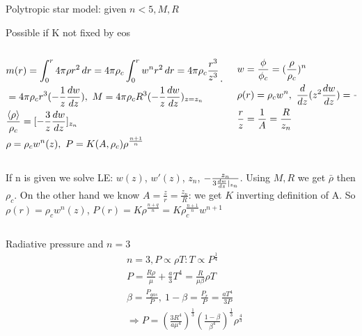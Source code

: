 \begin{frame}{Polytropic star model: given $n<5, M, R$}
\begin{block}{Possible if K not fixed by eos}
    \begin{columns}[T]
        \begin{column}{0.6\textwidth}
    \begin{align*}
&m(r)=\int_0^r4\pi\rho r^2\,dr=4\pi\rho_c\int_0^rw^nr^2\,dr=4\pi\rho_c\frac{r^3}{z^3}\int_0^zw^nz^2\,dz\\
&=4\pi\rho_cr^3(-\frac{1}{z}\TDy{z}{w}),\ M=4\pi\rho_cR^3(-\frac{1}{z}\TDy{z}{w})_{z=z_n}\\
&\frac{\exv{\rho}}{\rho_c}=[-\frac{3}{z}\TDy{z}{w}]_{z_n}\\
&\rho=\rho_cw^n(z),\ P=K(A,\rho_c)\rho^{\frac{n+1}{n}}
\end{align*}
        \end{column}
        \begin{column}{0.4\textwidth}
            \begin{align*}
            &w=\frac{\phi}{\phi_c}=(\frac{\rho}{\rho_c})^n\\
            &\rho(r)=\rho_cw^n,\ \TDof{z}(z^2\TDy{z}{w})=-z^2w^n\\
            &\frac{r}{z}=\frac{1}{A}=\frac{R}{z_n}
            \end{align*}
        \end{column}
    \end{columns}
    If n is given we solve LE: $w(z)$, $w'(z)$, $z_n$, $-\frac{z_n}{3\TDy{z}{w}|_{z_n}}$. Using $M,R$ we get $\bar{\rho}$ then $\rho_c$. On the other hand we know $A=\frac{z}{r}=\frac{z_n}{R}$: we get $K$ inverting definition of A. So $\rho(r)=\rho_cw^n(z)$, $P(r)=K\rho^{\frac{n+q}{n}}=K\rho_c^{\frac{n+1}{n}}w^{n+1}$
\end{block}
\begin{columns}[T]
\begin{column}{0.6\textwidth}
\begin{block}{Radiative pressure and $n=3$}
	\begin{align*}
    &n=3, P\propto\rho T: T\propto P^{\frac{1}{4}}\\
    &P=\frac{R\rho}{\mu}+\frac{a}{3}T^4=\frac{R}{\mu\beta}\rho T\\
    &\beta=\frac{P_{gas}}{P},\ 1-\beta=\frac{P_r}{P}=\frac{aT^4}{3P}\\
    &\Rightarrow P=(\frac{3R^4}{a\mu^4})^{\frac{1}{3}}(\frac{1-\beta}{\beta^4})^{\frac{1}{3}}\rho^{\frac{4}{3}}
	\end{align*}

\end{block}
\end{column}
\end{columns}
\end{frame}
